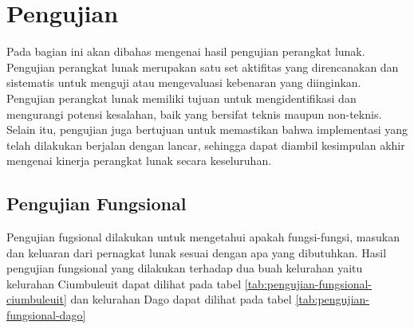 \section{Pengujian}
\label{sec:pengujian}
Pada bagian ini akan dibahas mengenai hasil pengujian perangkat lunak. Pengujian perangkat lunak merupakan satu set aktifitas yang direncanakan dan sistematis untuk menguji atau mengevaluasi kebenaran yang diinginkan\cite{rosa:11:pengujian}. Pengujian perangkat lunak memiliki tujuan untuk mengidentifikasi dan mengurangi potensi kesalahan, baik yang bersifat teknis maupun non-teknis. Selain itu, pengujian juga bertujuan untuk memastikan bahwa implementasi yang telah dilakukan berjalan dengan lancar, sehingga dapat diambil kesimpulan akhir mengenai kinerja perangkat lunak secara keseluruhan.

\subsection{Pengujian Fungsional}
Pengujian fugsional dilakukan untuk mengetahui apakah fungsi-fungsi, masukan dan keluaran dari pernagkat lunak sesuai dengan apa yang dibutuhkan. Hasil pengujian fungsional yang dilakukan terhadap dua buah kelurahan yaitu kelurahan Ciumbuleuit dapat dilihat pada tabel \ref{tab:pengujian-fungsional-ciumbuleuit} dan kelurahan Dago dapat dilihat pada tabel \ref{tab:pengujian-fungsional-dago}

